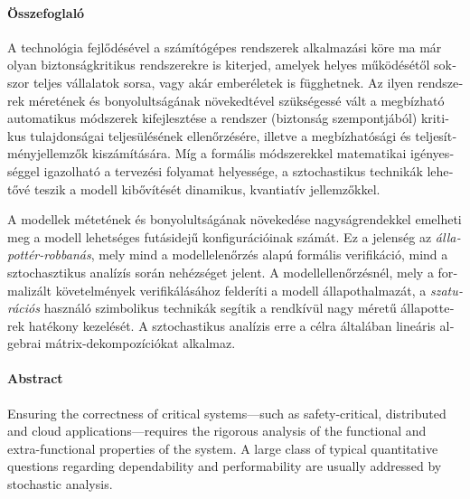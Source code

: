 \begin{otherlanguage}{magyar}

  \thispagestyle{plain}
  \paragraph*{Összefoglaló}

  A technológia fejlődésével a számítógépes rendszerek
  alkalmazási köre ma már olyan biztonságkritikus rendszerekre is
  kiterjed, amelyek helyes működésétől sokszor teljes vállalatok
  sorsa, vagy akár emberéletek is függhetnek. Az ilyen rendszerek
  méretének és bonyolultságának növekedtével szükségessé vált a
  megbízható automatikus módszerek kifejlesztése a rendszer (biztonság
  szempontjából) kritikus tulajdonságai teljesülésének ellenőrzésére,
  illetve a megbízhatósági és teljesítményjellemzők kiszámítására. Míg
  a formális módszerekkel matematikai igényességgel igazolható a
  tervezési folyamat helyessége, a sztochastikus technikák lehetővé
  teszik a modell kibővítését dinamikus, kvantiatív jellemzőkkel.

  A modellek métetének és bonyolultságának növekedése nagyságrendekkel
  emelheti meg a modell lehetséges futásidejű konfigurációinak
  számát. Ez a jelenség az \emph{állapottér-robbanás}, mely mind a
  modellelenőrzés alapú formális verifikáció, mind a sztochasztikus
  analízís során nehézséget jelent. A modellellenőrzésnél, mely a
  formalizált követelmények verifikálásához felderíti a modell
  állapothalmazát, a \emph{szaturációs} használó szimbolikus technikák
  segítik a rendkívül nagy méretű állapotterek hatékony kezelését. A
  sztochastikus analízis erre a célra általában lineáris algebrai
  mátrix-dekompozíciókat alkalmaz.

\end{otherlanguage}

\cleardoublepage

\thispagestyle{plain}
\paragraph*{Abstract}

Ensuring the correctness of critical systems---such as
safety-critical, distributed and cloud applications---requires the
rigorous analysis of the functional and extra-functional properties of
the system. A large class of typical quantitative questions regarding
dependability and performability are usually addressed by stochastic
analysis.

